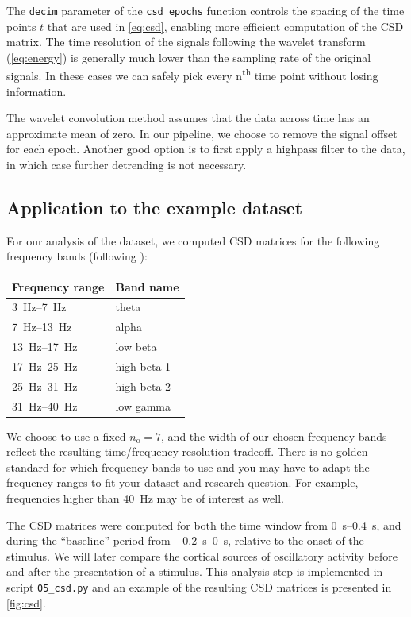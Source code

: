 \documentclass[utf8]{frontiersSCNS}
\newcommand{\textcite}[1]{\citet{#1}}
\newcommand{\code}[1]{\lstinline{#1}}
\begin{document}
The \code{decim} parameter of the \code{csd_epochs} function controls the spacing of the time points $t$ that are used in \autoref{eq:csd}, enabling more efficient computation of the CSD matrix.
The time resolution of the signals following the wavelet transform (\autoref{eq:energy}) is generally much lower than the sampling rate of the original signals.
In these cases we can safely pick every n\textsuperscript{th} time point without losing information.

The wavelet convolution method assumes that the data across time has an approximate mean of zero. In our pipeline, we choose to remove the signal offset for each epoch. Another good option is to first apply a highpass filter to the data, in which case further detrending is not necessary.

\subsection{Application to the example dataset}

For our analysis of the \textcite{Wakeman2015} dataset, we computed CSD matrices for the following frequency bands (following \textcite{Liljestrom2015a}):

\begin{tabular}{ll}
    Frequency range & Band name \\
    \toprule
    \SIrange{3}{7}{\hertz} & theta \\
    \SIrange{7}{13}{\hertz} & alpha \\
    \SIrange{13}{17}{\hertz} & low beta \\
    \SIrange{17}{25}{\hertz} & high beta 1 \\
    \SIrange{25}{31}{\hertz} & high beta 2 \\
    \SIrange{31}{40}{\hertz} & low gamma
\end{tabular}

We choose to use a fixed $n_\text{o}=7$, and the width of our chosen frequency bands reflect the resulting time/frequency resolution tradeoff.
There is no golden standard for which frequency bands to use and you may have to adapt the frequency ranges to fit your dataset and research question.
For example, frequencies higher than \SI{40}{\hertz} may be of interest as well.

The CSD matrices were computed for both the time window from \SIrange{0}{0.4}{\second}, and during the ``baseline'' period from \SIrange{-0.2}{0}{\second}, relative to the onset of the stimulus.
We will later compare the cortical sources of oscillatory activity before and after the presentation of a stimulus.
This analysis step is implemented in script \code{05_csd.py} and an example of the resulting CSD matrices is presented in \autoref{fig:csd}.
\end{document}
